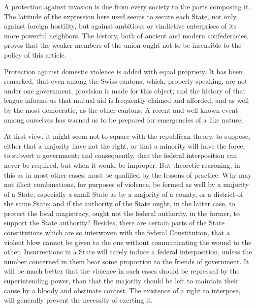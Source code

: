 A protection against invasion is due from every society to the parts composing it. The latitude of the expression here used seems to secure each State, not only against foreign hostility, but against ambitious or vindictive enterprises of its more powerful neighbors. The history, both of ancient and modern confederacies, proves that the weaker members of the union ought not to be insensible to the policy of this article.

Protection against domestic violence is added with equal propriety. It has been remarked, that even among the Swiss cantons, which, properly speaking, are not under one government, provision is made for this object; and the history of that league informs us that mutual aid is frequently claimed and afforded; and as well by the most democratic, as the other cantons. A recent and well-known event among ourselves has warned us to be prepared for emergencies of a like nature.

At first view, it might seem not to square with the republican theory, to suppose, either that a majority have not the right, or that a minority will have the force, to subvert a government; and consequently, that the federal interposition can never be required, but when it would be improper. But theoretic reasoning, in this as in most other cases, must be qualified by the lessons of practice. Why may not illicit combinations, for purposes of violence, be formed as well by a majority of a State, especially a small State as by a majority of a county, or a district of the same State; and if the authority of the State ought, in the latter case, to protect the local magistracy, ought not the federal authority, in the former, to support the State authority? Besides, there are certain parts of the State constitutions which are so interwoven with the federal Constitution, that a violent blow cannot be given to the one without communicating the wound to the other. Insurrections in a State will rarely induce a federal interposition, unless the number concerned in them bear some proportion to the friends of government. It will be much better that the violence in such cases should be repressed by the superintending power, than that the majority should be left to maintain their cause by a bloody and obstinate contest. The existence of a right to interpose, will generally prevent the necessity of exerting it.

